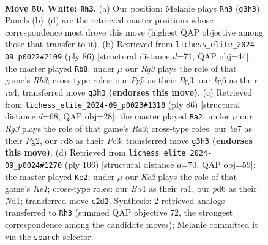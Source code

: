 \documentclass[11pt]{article}
\begin{document}
\clearpage

\begin{figure}[p]\centering
\begin{subfigure}{0.46\textwidth}\centering
\resizebox{\linewidth}{!}{%
\newchessgame
\chessboard[
  setfen={3r4/4b2p/p2pn1k1/P3p1Pp/1BP1P3/1P3PR1/2K3B1/8 w - - 1 50},
  showmover=false,
  pgfstyle=straightmove, color=movearrow, markmove={g3-h3}
]}
\caption{}
\end{subfigure}\hfill
\begin{subfigure}{0.46\textwidth}\centering
\resizebox{\linewidth}{!}{%
\newchessgame
\chessboard[
  setfen={4b3/5p2/3kpP2/3p1nPB/r4P2/PR1P2B1/P6K/8 w - - 1 44},
  showmover=false,
  pgfstyle=straightmove, color=movearrow, markmove={b3-b8}
]}
\caption{}
\end{subfigure}
\\[4pt]
\begin{subfigure}{0.46\textwidth}\centering
\resizebox{\linewidth}{!}{%
\newchessgame
\chessboard[
  setfen={8/1p3kp1/p1b2p1p/Pr6/3B2P1/R1P2P2/5KP1/8 w - - 32 44},
  showmover=false,
  pgfstyle=straightmove, color=movearrow, markmove={a3-a2}
]}
\caption{}
\end{subfigure}\hfill
\begin{subfigure}{0.46\textwidth}\centering
\resizebox{\linewidth}{!}{%
\newchessgame
\chessboard[
  setfen={8/1pp2b2/3k4/1PpPp3/2P1Pb2/5Bp1/2R3P1/r2NK3 w - - 1 54},
  showmover=false,
  pgfstyle=straightmove, color=movearrow, markmove={e1-e2}
]}
\caption{}
\end{subfigure}
\caption{\textbf{Move 50, White: \texttt{Rh3}.} (a) Our position; Melanie plays \texttt{Rh3} (\texttt{g3h3}). Panels (b)--(d) are the retrieved master positions whose correspondence most drove this move (highest QAP objective among those that transfer to it). (b) Retrieved from \texttt{lichess\_elite\_2024-09\_p0022\#2109} (ply 86) [structural distance $d$=71, QAP obj=44]: the master played \texttt{Rb8}; under $\mu$ our \emph{Rg3} plays the role of that game's \emph{Rb3}; cross-type roles: our \emph{P}g5 as their \emph{B}g3, our \emph{k}g6 as their \emph{r}a4; transferred move \texttt{g3h3} \textbf{(endorses this move)}. (c) Retrieved from \texttt{lichess\_elite\_2024-09\_p0023\#1318} (ply 86) [structural distance $d$=68, QAP obj=28]: the master played \texttt{Ra2}; under $\mu$ our \emph{Rg3} plays the role of that game's \emph{Ra3}; cross-type roles: our \emph{b}e7 as their \emph{P}g2, our \emph{r}d8 as their \emph{P}c3; transferred move \texttt{g3h3} \textbf{(endorses this move)}. (d) Retrieved from \texttt{lichess\_elite\_2024-09\_p0024\#1270} (ply 106) [structural distance $d$=70, QAP obj=59]: the master played \texttt{Ke2}; under $\mu$ our \emph{Kc2} plays the role of that game's \emph{Ke1}; cross-type roles: our \emph{B}b4 as their \emph{r}a1, our \emph{p}d6 as their \emph{N}d1; transferred move \texttt{c2d2}. Synthesis: 2 retrieved analogs transferred to \texttt{Rh3} (summed QAP objective 72, the strongest correspondence among the candidate moves); Melanie committed it via the \texttt{search} selector.}
\label{fig:thought-m98}
\end{figure}
\end{document}
